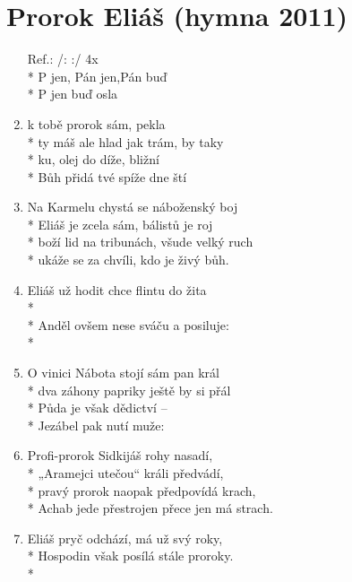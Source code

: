\section{Prorok Eliáš (hymna 2011)}
\begin{enumerate}
\item[Ref.:] /:  :/                      4x \\*
  P jen, Pán jen,Pán buď  \\*             %
P jen  buď osla 
\item {} k tobě prorok sám,  pekla \\*
	ty máš ale hlad jak trám,  by taky \\*
	ku, olej  do díže,  bližní\\*
	 Bůh přidá  tvé spíže  dne ští
\item Na Karmelu chystá se náboženský boj\\*
	Eliáš je zcela sám, bálistů je roj\\*
	boží lid na tribunách, všude velký ruch\\*
	ukáže se za chvíli, kdo je živý bůh.
\item Eliáš už hodit chce flintu do žita\\*
	\\*
	Anděl ovšem nese sváču a posiluje:\\*
\item O vinici Nábota stojí sám pan král\\*
	dva záhony papriky ještě by si přál\\*
	Půda je však dědictví -- \\*
	Jezábel pak nutí muže: 
\item Profi-prorok Sidkijáš rohy nasadí, \\*
	„Aramejci utečou“ králi předvádí, \\*
	pravý prorok naopak předpovídá krach, \\*
	Achab jede přestrojen přece jen má strach.\pagebreak
\item Eliáš pryč odchází, má už svý roky,\\*
	Hospodin však posílá stále proroky.\\*

\end{enumerate}

